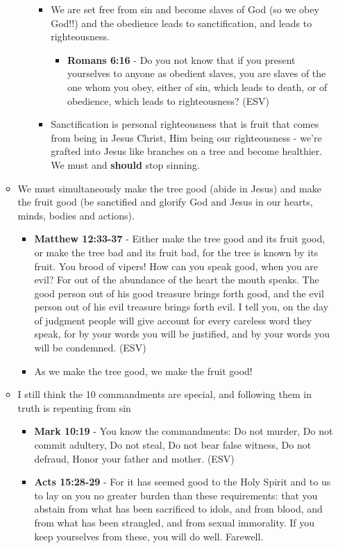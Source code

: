 \documentclass[11pt]{article}
\begin{document}
\begin{itemize}
\begin{itemize}
\begin{itemize}
\begin{itemize}
\item We are set free from sin and become slaves of God (so we obey God!!) and the obedience leads to sanctification, and leads to righteousness.
\begin{itemize}
\item \textbf{Romans 6:16} - Do you not know that if you present yourselves to anyone as obedient slaves, you are slaves of the one whom you obey, either of sin, which leads to death, or of obedience, which leads to righteousness? (ESV)
\end{itemize}
\item Sanctification is personal righteousness that is fruit that comes from being in Jesus Christ, Him being our righteousness - we're grafted into Jesus like branches on a tree and become healthier. We must and \textbf{should} stop sinning.
\end{itemize}
\end{itemize}
\item We must simultaneously make the tree good (abide in Jesus) and make the fruit good (be sanctified and glorify God and Jesus in our hearts, minds, bodies and actions).
\begin{itemize}
\item \textbf{Matthew 12:33-37} - Either make the tree good and its fruit good, or make the tree bad and its fruit bad, for the tree is known by its fruit. You brood of vipers! How can you speak good, when you are evil? For out of the abundance of the heart the mouth speaks. The good person out of his good treasure brings forth good, and the evil person out of his evil treasure brings forth evil. I tell you, on the day of judgment people will give account for every careless word they speak, for by your words you will be justified, and by your words you will be condemned. (ESV)
\item As we make the tree good, we make the fruit good!
\end{itemize}
\item I still think the 10 commandments are special, and following them in truth is repenting from sin
\begin{itemize}
\item \textbf{Mark 10:19} - You know the commandments: Do not murder, Do not commit adultery, Do not steal, Do not bear false witness, Do not defraud, Honor your father and mother. (ESV)
\item \textbf{Acts 15:28-29} - For it has seemed good to the Holy Spirit and to us to lay on you no greater burden than these requirements: that you abstain from what has been sacrificed to idols, and from blood, and from what has been strangled, and from sexual immorality. If you keep yourselves from these, you will do well. Farewell.
\end{itemize}
\end{itemize}
\end{itemize}
\end{document}
